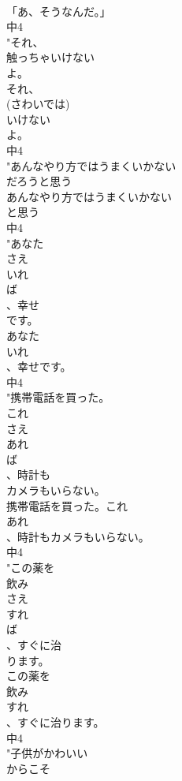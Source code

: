 \documentclass[8pt]{extreport}
\begin{document}
\begin{CJK}{UTF8}{min}
\\	「あ、そうなんだ。」
\\	中4
\\	"それ、
\\	触っちゃいけない
\\	よ。
\\	それ、
\\	(さわいでは)
\\	いけない
\\	よ。
\\	中4
\\	"あんなやり方ではうまくいかない
\\	だろうと思う
\\	あんなやり方ではうまくいかない
\\	と思う
\\	中4
\\	"あなた
\\	さえ
\\	いれ
\\	ば
\\	、幸せ
\\	です。
\\	あなた
\\	いれ
\\	、幸せです。
\\	中4
\\	"携帯電話を買った。
\\	これ
\\	さえ
\\	あれ
\\	ば
\\	、時計も
\\	カメラもいらない。
\\	携帯電話を買った。これ
\\	あれ
\\	、時計もカメラもいらない。
\\	中4
\\	"この薬を
\\	飲み
\\	さえ
\\	すれ
\\	ば
\\	、すぐに治
\\	ります。
\\	この薬を
\\	飲み
\\	すれ
\\	、すぐに治ります。
\\	中4
\\	"子供がかわいい
\\	からこそ

\end{CJK}
\end{document}
